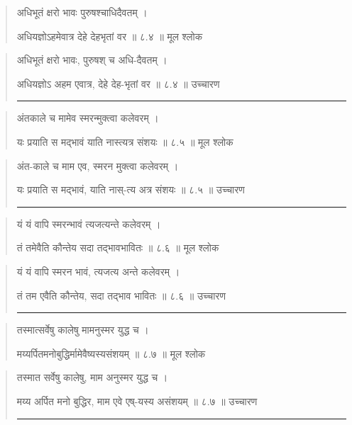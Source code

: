 \begin{quotation} 

अधिभूतं क्षरो भावः पुरुषश्चाधिदैवतम्‌  ।  

अधियज्ञोऽहमेवात्र देहे देहभृतां वर  ॥ ८.४ ॥  मूल श्लोक
\end{quotation}

\begin{quotation}

अधिभूतं क्षरो भावः, पुरुषश् च अधि-दैवतम्‌  ।  

अधियज्ञोऽ अहम एवात्र, देहे देह-भृतां वर  ॥ ८.४ ॥  उच्चारण

\noindent\rule{16cm}{0.4pt} 
\end{quotation}


\begin{quotation} 

अंतकाले च मामेव स्मरन्मुक्त्वा कलेवरम्‌  ।  

यः प्रयाति स मद्भावं याति नास्त्यत्र संशयः  ॥ ८.५ ॥  मूल श्लोक
\end{quotation}

\begin{quotation}
अंत-काले च माम एव, स्मरन मुक्त्वा कलेवरम्‌  ।  

यः प्रयाति स मद्भावं, याति नास्-त्य अत्र संशयः  ॥ ८.५ ॥  उच्चारण

\noindent\rule{16cm}{0.4pt} 
\end{quotation}


\begin{quotation} 

यं यं वापि स्मरन्भावं त्यजत्यन्ते कलेवरम्‌  ।  

तं तमेवैति कौन्तेय सदा तद्भावभावितः  ॥ ८.६ ॥  मूल श्लोक
\end{quotation}

\begin{quotation}

यं यं वापि स्मरन भावं, त्यजत्य अन्ते कलेवरम्‌  ।  

तं तम एवैति कौन्तेय, सदा तद्भाव भावितः  ॥ ८.६ ॥  उच्चारण

\noindent\rule{16cm}{0.4pt} 
\end{quotation}


\begin{quotation} 

तस्मात्सर्वेषु कालेषु मामनुस्मर युद्ध च  ।  

मय्यर्पितमनोबुद्धिर्मामेवैष्यस्यसंशयम्‌  ॥ ८.७ ॥  मूल श्लोक
\end{quotation}

\begin{quotation}

तस्मात सर्वेषु कालेषु, माम अनुस्मर युद्ध च  ।  

मय्य अर्पित मनो बुद्धिर, माम एवे एष्-यस्य असंशयम्‌  ॥ ८.७ ॥  उच्चारण

\noindent\rule{16cm}{0.4pt} 
\end{quotation}



